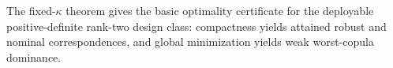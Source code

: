 The fixed-\(\kappa\) theorem gives the basic optimality certificate for the deployable positive-definite rank-two design class: compactness yields attained robust and nominal correspondences, and global minimization yields weak worst-copula dominance.